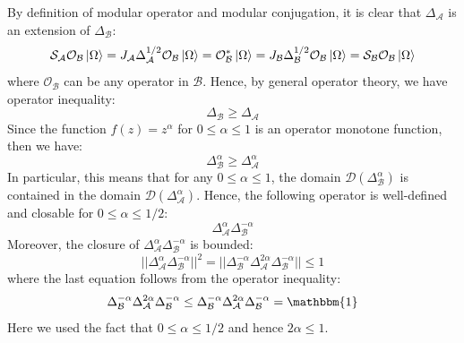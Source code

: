 \documentclass[a4paper,11pt]{article}
\theoremstyle{definition}
\begin{document}
By definition of modular operator and modular conjugation, it is clear that $\Delta_\mathcal{A}$ is an extension of $\Delta_\mathcal{B}$:
\begin{equation}
    \mathcal{S}_\mathcal{A}\mathcal{O}_\mathcal{B}\ket{\Omega} = J_\mathcal{A}\Delta_\mathcal{A}^{1/2}\mathcal{O}_\mathcal{B}\ket{\Omega} = \mathcal{O}_\mathcal{B}^*\ket{\Omega} = J_\mathcal{B}\Delta_\mathcal{B}^{1/2}\mathcal{O}_\mathcal{B}\ket{\Omega} = \mathcal{S}_\mathcal{B}\mathcal{O}_\mathcal{B}\ket{\Omega}
\end{equation}
where $\mathcal{O}_\mathcal{B}$ can be any operator in $\mathcal{B}$. Hence, by general operator theory, we have operator inequality:
\begin{equation}
    \Delta_\mathcal{B}\geq \Delta_\mathcal{A}
\end{equation}
Since the function $f(z)  = z^\alpha$ for $0\leq \alpha\leq 1$ is an operator monotone function, then we have:
\begin{equation}
    \Delta_\mathcal{B}^\alpha \geq \Delta_\mathcal{A}^\alpha
\end{equation}
In particular, this means that for any $0\leq \alpha\leq 1$, the domain $\mathcal{D}(\Delta_\mathcal{B}^\alpha)$ is contained in the domain $\mathcal{D}(\Delta_\mathcal{A}^\alpha)$. Hence, the following operator is well-defined and closable for $0\leq \alpha\leq 1/2$:
\begin{equation}
    \Delta_\mathcal{A}^\alpha \Delta_\mathcal{B}^{-\alpha}
\end{equation}
Moreover, the closure of $\Delta_\mathcal{A}^\alpha\Delta_\mathcal{B}^{-\alpha}$ is bounded:
\begin{equation}
    ||\Delta_\mathcal{A}^\alpha\Delta_\mathcal{B}^{-\alpha}||^2 = ||\Delta_\mathcal{B}^{-\alpha}\Delta_\mathcal{A}^{2\alpha}\Delta_\mathcal{B}^{-\alpha}|| \leq 1
\end{equation}
where the last equation follows from the operator inequality:
\begin{equation}
    \Delta_\mathcal{B}^{-\alpha}\Delta_\mathcal{A}^{2\alpha}\Delta_\mathcal{B}^{-\alpha} \leq \Delta_\mathcal{B}^{-\alpha}\Delta_\mathcal{A}^{2\alpha}\Delta_\mathcal{B}^{-\alpha} = \mathbbm{1}
\end{equation}
Here we used the fact that $0\leq \alpha\leq 1/2$ and hence $2\alpha \leq 1$.
\end{document}
